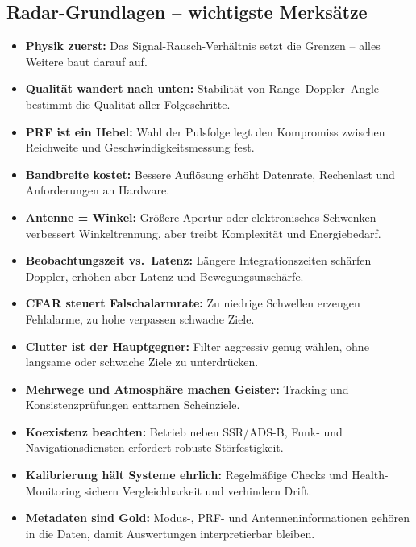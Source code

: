 \subsection{Radar-Grundlagen – wichtigste Merksätze}
\begin{itemize}
  \item \textbf{Physik zuerst:} Das Signal-Rausch-Verhältnis setzt die Grenzen – alles Weitere baut darauf auf.
  \item \textbf{Qualität wandert nach unten:} Stabilität von Range–Doppler–Angle bestimmt die Qualität aller Folgeschritte.
  \item \textbf{PRF ist ein Hebel:} Wahl der Pulsfolge legt den Kompromiss zwischen Reichweite und Geschwindigkeitsmessung fest.
  \item \textbf{Bandbreite kostet:} Bessere Auflösung erhöht Datenrate, Rechenlast und Anforderungen an Hardware.
  \item \textbf{Antenne = Winkel:} Größere Apertur oder elektronisches Schwenken verbessert Winkeltrennung, aber treibt Komplexität und Energiebedarf.
  \item \textbf{Beobachtungszeit vs.\ Latenz:} Längere Integrationszeiten schärfen Doppler, erhöhen aber Latenz und Bewegungsunschärfe.
  \item \textbf{CFAR steuert Falschalarmrate:} Zu niedrige Schwellen erzeugen Fehlalarme, zu hohe verpassen schwache Ziele.
  \item \textbf{Clutter ist der Hauptgegner:} Filter aggressiv genug wählen, ohne langsame oder schwache Ziele zu unterdrücken.
  \item \textbf{Mehrwege und Atmosphäre machen Geister:} Tracking und Konsistenzprüfungen enttarnen Scheinziele.
  \item \textbf{Koexistenz beachten:} Betrieb neben SSR/ADS-B, Funk- und Navigationsdiensten erfordert robuste Störfestigkeit.
  \item \textbf{Kalibrierung hält Systeme ehrlich:} Regelmäßige Checks und Health-Monitoring sichern Vergleichbarkeit und verhindern Drift.
  \item \textbf{Metadaten sind Gold:} Modus-, PRF- und Antenneninformationen gehören in die Daten, damit Auswertungen interpretierbar bleiben.
\end{itemize}

